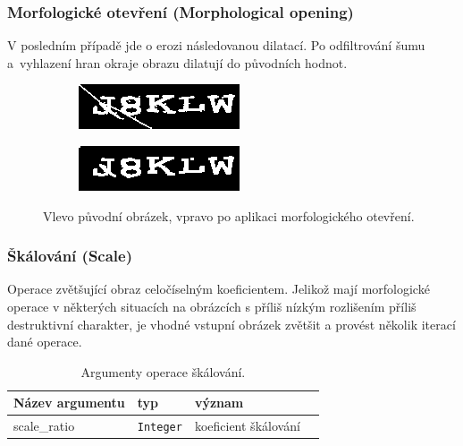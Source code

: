 \documentclass[
  field=ainfp,
  master=true,
  biblatex,
  sourcecodes=false,
  theorems=false,
  glossaries,
  index
]{kidiplom}
\begin{document}
\subsubsection*{Morfologické otevření (Morphological opening)}
V posledním případě jde o erozi následovanou dilatací. Po odfiltrování šumu a~vyhlazení hran okraje obrazu dilatují do původních hodnot.
\begin{figure}[H]
\centering
\begin{subfigure}{.5\textwidth}
  \centering
  \includegraphics[width=.8\linewidth]{images/opening_original.png}
\end{subfigure}%
\begin{subfigure}{.5\textwidth}
  \centering
  \includegraphics[width=.8\linewidth]{images/opening_result.png}
\end{subfigure}
\caption{Vlevo původní obrázek, vpravo po aplikaci morfologického otevření.}
\label{fig:inverse_example}
\end{figure}

\subsubsection*{Škálování (Scale)}
Operace zvětšující obraz celočíselným koeficientem. Jelikož mají morfologické operace v některých situacích na obrázcích s příliš nízkým rozlišením příliš destruktivní charakter, je vhodné vstupní obrázek zvětšit a provést několik iterací dané operace.

\begin{table}[H]
\centering
\begin{tabular}{|l|l|l|l|}
\hline
\textbf{Název argumentu} & \textbf{typ} & \textbf{význam}
\\ \hline
scale\_ratio & \texttt{Integer} & koeficient škálování
\\ \hline
\end{tabular}
\caption{Argumenty operace škálování.}
\end{table}
\end{document}
